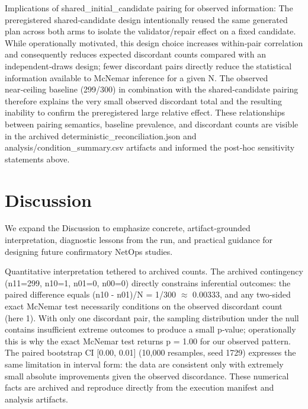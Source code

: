 \documentclass[conference]{IEEEtran}
\begin{document}
Implications of shared\_initial\_candidate pairing for observed information: The preregistered shared‑candidate design intentionally reused the same generated plan across both arms to isolate the validator/repair effect on a fixed candidate. While operationally motivated, this design choice increases within‑pair correlation and consequently reduces expected discordant counts compared with an independent‑draws design; fewer discordant pairs directly reduce the statistical information available to McNemar inference for a given N. The observed near‑ceiling baseline (299/300) in combination with the shared‑candidate pairing therefore explains the very small observed discordant total and the resulting inability to confirm the preregistered large relative effect. These relationships between pairing semantics, baseline prevalence, and discordant counts are visible in the archived deterministic\_reconciliation.json and analysis/condition\_summary.csv artifacts and informed the post‑hoc sensitivity statements above.

\section{Discussion}
We expand the Discussion to emphasize concrete, artifact‑grounded interpretation, diagnostic lessons from the run, and practical guidance for designing future confirmatory NetOps studies.

Quantitative interpretation tethered to archived counts. The archived contingency (n11=299, n10=1, n01=0, n00=0) directly constrains inferential outcomes: the paired difference equals (n10 - n01)/N = 1/300 \ensuremath{\approx} 0.00333, and any two‑sided exact McNemar test necessarily conditions on the observed discordant count (here 1). With only one discordant pair, the sampling distribution under the null contains insufficient extreme outcomes to produce a small p‑value; operationally this is why the exact McNemar test returns p = 1.00 for our observed pattern. The paired bootstrap CI [0.00, 0.01] (10,000 resamples, seed 1729) expresses the same limitation in interval form: the data are consistent only with extremely small absolute improvements given the observed discordance. These numerical facts are archived and reproduce directly from the execution manifest and analysis artifacts.
\end{document}
